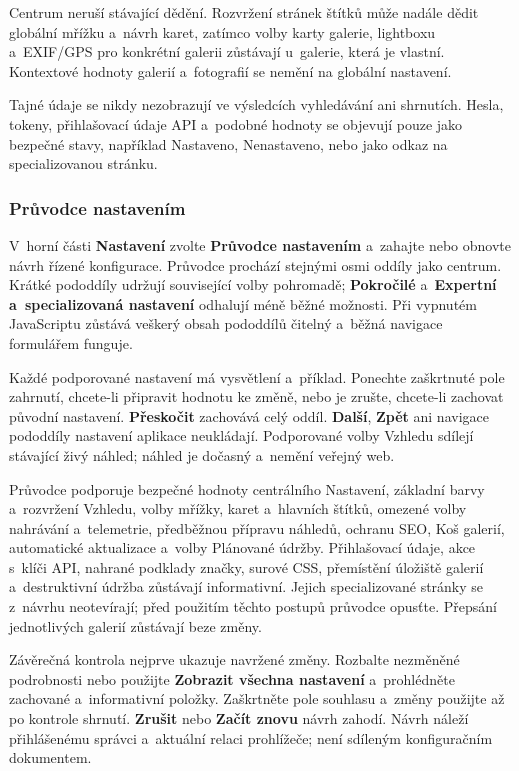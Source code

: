\documentclass[11pt,a4paper]{article}
\newcommand{\ui}[1]{\textbf{#1}}
\begin{document}
Centrum neruší stávající dědění. Rozvržení stránek štítků může nadále dědit
globální mřížku a~návrh karet, zatímco volby karty galerie, lightboxu a~EXIF/GPS
pro konkrétní galerii zůstávají u~galerie, která je vlastní. Kontextové hodnoty
galerií a~fotografií se nemění na globální nastavení.

Tajné údaje se nikdy nezobrazují ve výsledcích vyhledávání ani shrnutích. Hesla,
tokeny, přihlašovací údaje API a~podobné hodnoty se objevují pouze jako bezpečné
stavy, například Nastaveno, Nenastaveno, nebo jako odkaz na specializovanou
stránku.

\subsubsection{Průvodce nastavením}

V~horní části \ui{Nastavení} zvolte \ui{Průvodce nastavením} a~zahajte nebo
obnovte návrh řízené konfigurace. Průvodce prochází stejnými osmi oddíly jako
centrum. Krátké pododdíly udržují související volby pohromadě; \ui{Pokročilé}
a~\ui{Expertní a~specializovaná nastavení} odhalují méně běžné možnosti. Při
vypnutém JavaScriptu zůstává veškerý obsah pododdílů čitelný a~běžná navigace
formulářem funguje.

Každé podporované nastavení má vysvětlení a~příklad. Ponechte zaškrtnuté pole
zahrnutí, chcete-li připravit hodnotu ke změně, nebo je zrušte, chcete-li
zachovat původní nastavení. \ui{Přeskočit} zachovává celý oddíl. \ui{Další},
\ui{Zpět} ani navigace pododdíly nastavení aplikace neukládají. Podporované
volby Vzhledu sdílejí stávající živý náhled; náhled je dočasný a~nemění veřejný
web.

Průvodce podporuje bezpečné hodnoty centrálního Nastavení, základní barvy
a~rozvržení Vzhledu, volby mřížky, karet a~hlavních štítků, omezené volby
nahrávání a~telemetrie, předběžnou přípravu náhledů, ochranu SEO, Koš galerií,
automatické aktualizace a~volby Plánované údržby. Přihlašovací údaje, akce
s~klíči API, nahrané podklady značky, surové CSS, přemístění úložiště galerií
a~destruktivní údržba zůstávají informativní. Jejich specializované stránky se
z~návrhu neotevírají; před použitím těchto postupů průvodce opusťte. Přepsání
jednotlivých galerií zůstávají beze změny.

Závěrečná kontrola nejprve ukazuje navržené změny. Rozbalte nezměněné
podrobnosti nebo použijte \ui{Zobrazit všechna nastavení} a~prohlédněte
zachované a~informativní položky. Zaškrtněte pole souhlasu a~změny použijte až
po kontrole shrnutí. \ui{Zrušit} nebo \ui{Začít znovu} návrh zahodí. Návrh
náleží přihlášenému správci a~aktuální relaci prohlížeče; není sdíleným
konfiguračním dokumentem.
\end{document}
